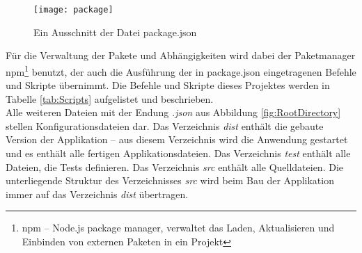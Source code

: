 \begin{figure}[htp]
	\centering
	\captionsetup{justification=centering}
	\texttt{[image: package]}
	\caption[Package]{Ein Ausschnitt der Datei package.json}
	\label{fig:Package}
\end{figure}

\noindent Für die Verwaltung der Pakete und Abhängigkeiten wird dabei der Paketmanager npm\footnote{npm -- Node.js package manager, verwaltet das Laden, Aktualisieren und Einbinden von externen Paketen in ein Projekt} benutzt, der auch die Ausführung der in package.json eingetragenen Befehle und Skripte übernimmt. Die Befehle und Skripte dieses Projektes werden in Tabelle \ref{tab:Scripts} aufgelistet und beschrieben.\\
Alle weiteren Dateien mit der Endung \emph{.json} aus Abbildung \ref{fig:RootDirectory} stellen Konfigurationsdateien dar. Das Verzeichnis \emph{dist} enthält die gebaute Version der Applikation -- aus diesem Verzeichnis wird die Anwendung gestartet und es enthält alle fertigen Applikationsdateien. Das Verzeichnis \emph{test} enthält alle Dateien, die Tests definieren. Das Verzeichnis \emph{src} enthält alle Quelldateien. Die unterliegende Struktur des Verzeichnisses \emph{src} wird beim Bau der Applikation immer auf das Verzeichnis \emph{dist} übertragen.\clearpage

